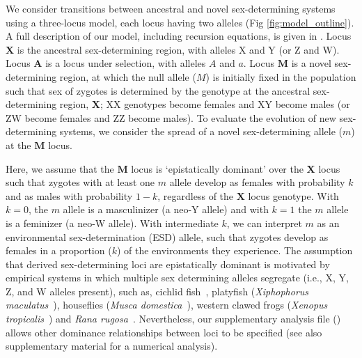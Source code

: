 \documentclass[10pt,letterpaper]{article}
\begin{document}
We consider transitions between ancestral and novel sex-determining systems using a three-locus model, each locus having two alleles (Fig \ref{fig:model_outline}). A full description of our model, including recursion equations, is given in . 
Locus $\mathbf{X}$ is the ancestral sex-determining region, with alleles X and Y (or Z and W).
Locus $\mathbf{A}$ is a locus under selection, with alleles $A$ and $a$.
Locus $\mathbf{M}$ is a novel sex-determining region, at which the null allele ($M$) is initially fixed in the population such that sex of zygotes is determined by the genotype at the ancestral sex-determining region, $\mathbf{X}$; XX genotypes become females and XY become males (or ZW become females and ZZ become males). 
To evaluate the evolution of new sex-determining systems, we consider the spread of a novel sex-determining allele ($m$) at the $\mathbf{M}$ locus. 

Here, we assume that the $\mathbf{M}$ locus is `epistatically dominant' over the $\mathbf{X}$ locus such that zygotes with at least one $m$ allele develop as females with probability $k$ and as males with probability $1-k$, regardless of the $\mathbf{X}$ locus genotype. 
With $k=0$, the $m$ allele is a masculinizer (a neo-Y allele) and with $k=1$ the $m$ allele is a feminizer (a neo-W allele). 
With intermediate $k$, we can interpret $m$ as an environmental sex-determination (ESD) allele, such that zygotes develop as females in a proportion ($k$) of the environments they experience. 
The assumption that derived sex-determining loci are epistatically dominant is motivated by empirical systems in which multiple sex determining alleles segregate (i.e., X, Y, Z, and W alleles present), such as, cichlid fish~\cite{Ser:2010iq}, platyfish (\textit{Xiphophorus maculatus}~\cite{Kallman1968}), houseflies (\textit{Musca domestica}~\cite{Dubendorfer2002}), western clawed frogs (\textit{Xenopus tropicalis}~\cite{Roco2015}) and \textit{Rana rugosa}~\cite{Ogata:2007jm}.  
Nevertheless, our supplementary analysis file () allows other dominance relationships between loci to be specified (see also \cite{vanDoorn:2007eu} supplementary material for a numerical analysis). 
\end{document}
